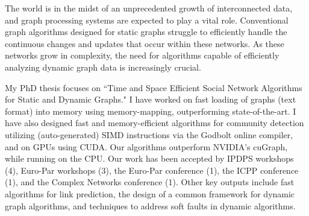 The world is in the midst of an unprecedented growth of interconnected data, and graph processing systems are expected to play a vital role. Conventional graph algorithms designed for static graphs struggle to efficiently handle the continuous changes and updates that occur within these networks. As these networks grow in complexity, the need for algorithms capable of efficiently analyzing dynamic graph data is increasingly crucial.

My PhD thesis focuses on ``Time and Space Efficient Social Network Algorithms for Static and Dynamic Graphs." I have worked on fast loading of graphs (text format) into memory using memory-mapping, outperforming state-of-the-art. I have also designed fast and memory-efficient algorithms for community detection utilizing (auto-generated) SIMD instructions via the Godbolt online compiler, and on GPUs using CUDA. Our algorithms outperform NVIDIA's cuGraph, while running on the CPU. Our work has been accepted by IPDPS workshops (4), Euro-Par workshops (3), the Euro-Par conference (1), the ICPP conference (1), and the Complex Networks conference (1). Other key outputs include fast algorithms for link prediction, the design of a common framework for dynamic graph algorithms, and techniques to address soft faults in dynamic algorithms.


